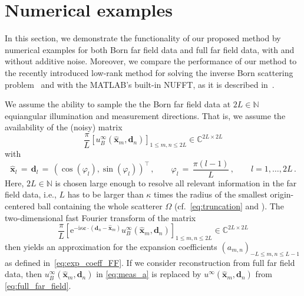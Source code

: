 \documentclass[11pt,a4paper]{article}
\theoremstyle{definition}
\theoremstyle{remark} \newtheorem{remark}[theorem]{Remark}
\numberwithin{equation}{section}
\numberwithin{figure}{section}
\numberwithin{algorithm}{section}
\numberwithin{table}{section}
\newcommand{\field}[1]{{\mathbb{#1}}}
\newcommand{\C}{\field{C}}
\newcommand{\N}{\field{N}}
\newcommand{\bs}{\boldsymbol}
\newcommand{\bfc}{{\bs c}}
\newcommand{\bfd}{{\bs d}}
\newcommand{\bfx}{{\bs x}}
\newcommand{\xhat}{\widehat{\bfx}}
\newcommand{\idir}{\bfd}
\newcommand{\rmi}{\mathrm{i}}
\newcommand{\rme}{\mathrm{e}}
\begin{document}
\section{Numerical examples}
\label{sec:NumericalExamples}

In this section, we demonstrate the functionality of our proposed method by numerical examples for both Born far field data and full far field data, with and without additive noise. Moreover, we compare the performance of our method to the recently introduced low-rank method for solving the inverse Born scattering problem~\cite{ZhoAudMenZha26} and with the MATLAB's built-in NUFFT, as it is described in~\cite{DutRoh93}.


We assume the ability to sample the the Born far field data at $2L\in\N$ equiangular illumination and measurement directions. That is, we assume the availability of the (noisy) matrix
\begin{equation}
\label{eq:observation}
    \frac {\pi} L \left[ u_B^\infty(\xhat_m,\idir_n) \right]_{1\leq m,n\leq 2L} \in\C^{2L\times 2L}
\end{equation}
with
\begin{equation*}
    \xhat_l \,=\, \idir_l \,=\, (\cos(\varphi_l),\sin(\varphi_l))^\top
    \,,\qquad
    \varphi_l \,=\, \frac {\pi (l-1)} L
    \,,\qquad
    l=1,\ldots,2L\,.
\end{equation*}
Here, $2L\in\N$ is chosen large enough to resolve all relevant information in the far field data, i.e., $L$ has to be larger than $\kappa$ times the radius of the smallest origin-centered ball containing the whole scatterer $\Omega$ (cf.~\eqref{eq:truncation} and \cite{GriSch24}).
The two-dimensional fast Fourier transform of the matrix 
\begin{equation}
\label{eq:meas_a}
    \frac \pi L\left[ \rme^{-\rmi\kappa\bfc\cdot(\idir_n-\xhat_m)} u_B^\infty(\xhat_m,\idir_n)\right]_{1\leq m,n\leq 2L}\in\C^{2L\times 2L}
\end{equation}
then yields an approximation for the expansion coefficients $(a_{m,n})_{-L\leq m,n\leq L-1}$ as defined in~\eqref{eq:exp_coeff_FF}. If we consider reconstruction from full far field data, then $u_B^\infty(\xhat_m,\idir_n)$ in \eqref{eq:meas_a} is replaced by $u^\infty(\xhat_m,\idir_n)$ from \eqref{eq:full_far_field}.
\end{document}
